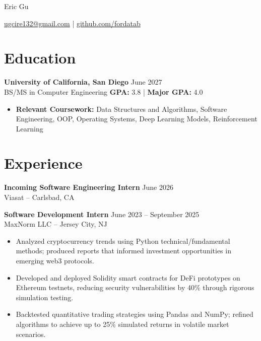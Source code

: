 \documentclass[11pt]{article}
\begin{document}
\centerline{\Huge Eric Gu}
\vspace{2pt}
\centerline{\href{mailto:ugcire132@gmail.com}{ugcire132@gmail.com} | \href{https://github.com/fordatab}{github.com/fordatab}}
\vspace{-10pt}

\section*{Education}
\textbf{University of California, San Diego} \hfill June 2027 \\
BS/MS in Computer Engineering \hfill \textbf{GPA:} 3.8 | \textbf{Major GPA:} 4.0
\vspace{2pt}
\begin{itemize}[leftmargin=*, nosep]
    \item \textbf{Relevant Coursework:} Data Structures and Algorithms, Software Engineering, OOP, Operating Systems, Deep Learning Models, Reinforcement Learning
\end{itemize}
\vspace{-12pt}

\section*{Experience}
\textbf{Incoming Software Engineering Intern} \hfill June 2026 \\
Viasat -- Carlsbad, CA

\vspace{4pt}

\textbf{Software Development Intern} \hfill June 2023 -- September 2025 \\
MaxNorm LLC -- Jersey City, NJ 
\vspace{-2pt}
\begin{itemize}
    \item Analyzed cryptocurrency trends using Python technical/fundamental methods; produced reports that informed investment opportunities in emerging web3 protocols.
    \item Developed and deployed Solidity smart contracts for DeFi prototypes on Ethereum testnets, reducing security vulnerabilities by 40\% through rigorous simulation testing.
    \item Backtested quantitative trading strategies using Pandas and NumPy; refined algorithms to achieve up to 25\% simulated returns in volatile market scenarios.
\end{itemize}
\vspace{-12pt}
\end{document}
